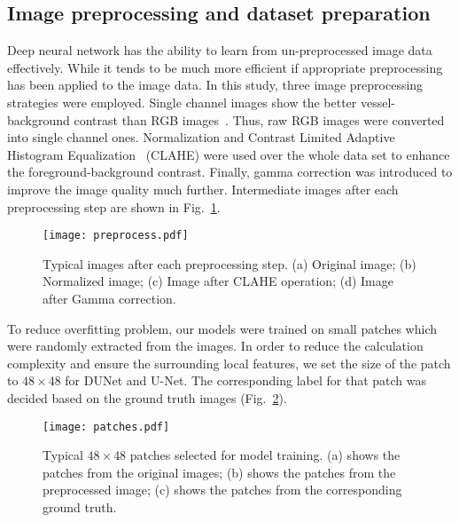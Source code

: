 \documentclass[journal]{IEEEtran}
\begin{document}
\subsection{Image preprocessing and dataset preparation}
Deep neural network has the ability to learn from un-preprocessed image data effectively. While it tends to be much more efficient if appropriate preprocessing has been applied to the image data. In this study, three image preprocessing strategies were employed. Single channel images show the better vessel-background contrast than RGB images~\cite{soares_retinal_2006}. Thus, raw RGB images were converted into single channel ones. Normalization and Contrast Limited Adaptive Histogram Equalization~\cite{pizer_adaptive_1987} (CLAHE) were used over the whole data set to enhance the foreground-background contrast. Finally, gamma correction was introduced to improve the image quality much further. Intermediate images after each preprocessing step are shown in Fig.~\ref{fig:preprocess}.
\begin{figure}
\centering
\texttt{[image: preprocess.pdf]}
\caption{Typical images after each preprocessing step. (a) Original image; (b) Normalized image; (c) Image after CLAHE operation; (d) Image after Gamma correction.}
\label{fig:preprocess}
\end{figure}


To reduce overﬁtting problem, our models were trained on small patches which were randomly extracted from the images. In order to reduce the calculation complexity and ensure the surrounding local features, we set the size of the patch to $48 \times 48$ for DUNet and U-Net. The corresponding label for that patch was decided based on the ground truth images (Fig.~\ref{fig:patches}).

\begin{figure}
\centering
\texttt{[image: patches.pdf]}
\caption{Typical $48 \times 48$ patches selected for model training. (a) shows the patches from the original images; (b) shows the patches from the preprocessed image; (c) shows the patches from the corresponding ground truth.}
\label{fig:patches}
\end{figure}
\end{document}
